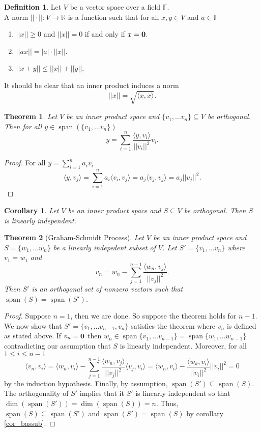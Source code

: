 \documentclass[oneside, 12pt]{book}
\DeclareMathOperator{\spn}{span}
\newtheorem{thm}{Theorem}[section]
\newtheorem{cor}{Corollary}[section]
\theoremstyle{definition}
\newtheorem{defn}{Definition}[section]
\begin{document}
\begin{defn}
  \label{defn_norm}
  Let $V$ be a vector space over a field $\mathbb{F}$. \\ A norm $|| \cdot ||: V \to \mathbb{R}$  is a function such that for all $x,y \in V$ and $a \in \mathbb{F}$
  \begin{enumerate}
    \item $||x|| \geq 0$ and $||x||=0$ if and only if $x= \bold{0}$.
    \item $||ax||=|a| \cdot ||x||$.
    \item $||x+y|| \leq ||x|| + ||y||$.
  \end{enumerate}
\end{defn}
It should be clear that an inner product induces a norm \[||x||=\sqrt{\langle x , x \rangle}.\]
\begin{thm}
  \label{thm_orthovec}
  Let $V$ be an inner product space and $\{v_{1}, \dots v_{n}\} \subseteq V$ be orthogonal.
  Then for all $y \in \spn(\{v_{1}, \dots v_{n}\})$
  \[y= \sum_{i=1}^{n}\frac{\langle y , v_{i} \rangle}{||v_{i}||^{2}}v_{i}.\]
\end{thm}
\begin{proof}
For all $y=\sum_{i=1}^{n}a_{i}v_{i}$ \[\langle y , v_{j} \rangle= \sum_{i=1}^{n}a_{i}\langle v_{i}, v_{j} \rangle=a_{j}\langle v_{j}, v_{j} \rangle=a_{j}||v_{j}||^{2}.\]
\end{proof}
\begin{cor}
  \label{cor_ortholinind}
  Let $V$ be an inner product space and $S \subseteq V$ be orthogonal. Then $S$ is linearly independent.
\end{cor}
\begin{thm}[Graham-Schmidt Process]
  \label{thm_graham-schmidt}
Let $V$ be an inner product space and $S=\{w_{1} ,\dots w_{n}\}$ be a linearly indepedent subset of $V$. Let $S'=\{v_{1}, \dots v_{n}\}$ where $v_{1}=w_{1}$ and \[v_{n}= w_{n}- \sum_{j=1}^{n-1}\frac{\langle w_{n}, v_{j} \rangle}{||v_{j}||^{2}}.\]
Then $S'$ is an orthogonal set of nonzero vectors such that $\spn(S)=\spn(S')$.
\end{thm}
\begin{proof}
Suppose $n=1$, then we are done. So suppose the theorem holds for $n-1$. We now show that $S'=\{v_{1}, \dots v_{n-1}, v_{n}\}$ satisfies the theorem where $v_{n}$ is defined as stated above. If $v_{n}= \bold{0}$ then $w_{n} \in \spn\{v_{1}, \dots v_{n-1}\}=\spn\{w_{1}, \dots w_{n-1}\}$ contradicting our assumption that $S$ is linearly independent.
Moreover, for all $1 \leq i \leq n-1$
\[\langle v_{n}, v_{i} \rangle = \langle w_{n}, v_{i} \rangle- \sum_{j=1}^{n-1}\frac{\langle w_{n}, v_{j} \rangle}{||v_{j}||^{2}}\langle v_{j}, v_{i} \rangle = \langle w_{n} , v_{i} \rangle - \frac{\langle w_{k} , v_{i} \rangle}{||v_{i}||^{2}}||v_{i}||^{2}=0\] by the induction hypothesis.
Finally, by assumption, $\spn(S') \subseteq \spn(S)$. The orthogonality of $S'$ implies that it $S'$ is linearly independent so that $\dim(\spn(S'))=\dim(\spn(S))=n$. Thus, $\spn(S) \subseteq \spn(S')$ and $\spn(S')=\spn(S)$ by corollary \ref{cor_bassub}.
\end{proof}
\end{document}
